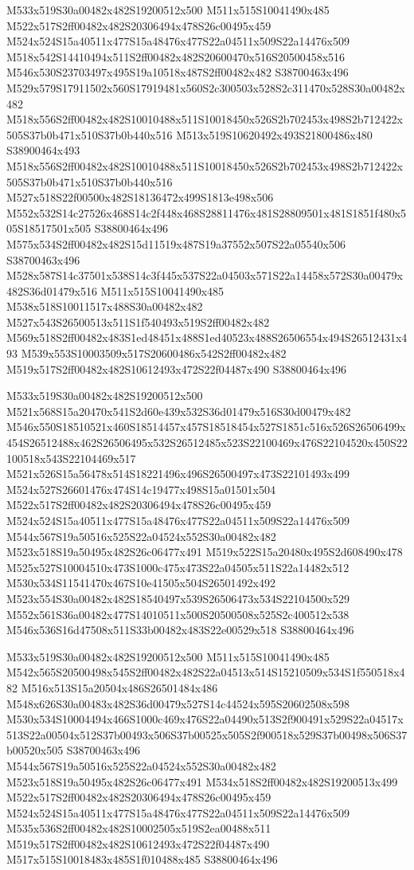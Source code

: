 \documentclass{article}
\begin{document}
\begin{multicols}{2}
M533x519S30a00482x482S19200512x500 M511x515S10041490x485 M522x517S2ff00482x482S20306494x478S26c00495x459 M524x524S15a40511x477S15a48476x477S22a04511x509S22a14476x509 M518x542S14410494x511S2ff00482x482S20600470x516S20500458x516 M546x530S23703497x495S19a10518x487S2ff00482x482 S38700463x496 M529x579S17911502x560S17919481x560S2c300503x528S2c311470x528S30a00482x482 M518x556S2ff00482x482S10010488x511S10018450x526S2b702453x498S2b712422x505S37b0b471x510S37b0b440x516 M513x519S10620492x493S21800486x480 S38900464x493 M518x556S2ff00482x482S10010488x511S10018450x526S2b702453x498S2b712422x505S37b0b471x510S37b0b440x516 M527x518S22f00500x482S18136472x499S1813e498x506 M552x532S14c27526x468S14c2f448x468S28811476x481S28809501x481S1851f480x505S18517501x505 S38800464x496 M575x534S2ff00482x482S15d11519x487S19a37552x507S22a05540x506 S38700463x496 M528x587S14c37501x538S14c3f445x537S22a04503x571S22a14458x572S30a00479x482S36d01479x516 M511x515S10041490x485 M538x518S10011517x488S30a00482x482 M527x543S26500513x511S1f540493x519S2ff00482x482 M569x518S2ff00482x483S1ed48451x488S1ed40523x488S26506554x494S26512431x493 M539x553S10003509x517S20600486x542S2ff00482x482 M519x517S2ff00482x482S10612493x472S22f04487x490 S38800464x496

M533x519S30a00482x482S19200512x500 M521x568S15a20470x541S2d60e439x532S36d01479x516S30d00479x482 M546x550S18510521x460S18514457x457S18518454x527S1851c516x526S26506499x454S26512488x462S26506495x532S26512485x523S22100469x476S22104520x450S22100518x543S22104469x517 M521x526S15a56478x514S18221496x496S26500497x473S22101493x499 M524x527S26601476x474S14c19477x498S15a01501x504 M522x517S2ff00482x482S20306494x478S26c00495x459 M524x524S15a40511x477S15a48476x477S22a04511x509S22a14476x509 M544x567S19a50516x525S22a04524x552S30a00482x482 M523x518S19a50495x482S26c06477x491 M519x522S15a20480x495S2d608490x478 M525x527S10004510x473S1000c475x473S22a04505x511S22a14482x512 M530x534S11541470x467S10e41505x504S26501492x492 M523x554S30a00482x482S18540497x539S26506473x534S22104500x529 M552x561S36a00482x477S14010511x500S20500508x525S2c400512x538 M546x536S16d47508x511S33b00482x483S22e00529x518 S38800464x496

M533x519S30a00482x482S19200512x500 M511x515S10041490x485 M542x565S20500498x545S2ff00482x482S22a04513x514S15210509x534S1f550518x482 M516x513S15a20504x486S26501484x486 M548x626S30a00483x482S36d00479x527S14c44524x595S20602508x598 M530x534S10004494x466S1000c469x476S22a04490x513S2f900491x529S22a04517x513S22a00504x512S37b00493x506S37b00525x505S2f900518x529S37b00498x506S37b00520x505 S38700463x496 M544x567S19a50516x525S22a04524x552S30a00482x482 M523x518S19a50495x482S26c06477x491 M534x518S2ff00482x482S19200513x499 M522x517S2ff00482x482S20306494x478S26c00495x459 M524x524S15a40511x477S15a48476x477S22a04511x509S22a14476x509 M535x536S2ff00482x482S10002505x519S2ea00488x511 M519x517S2ff00482x482S10612493x472S22f04487x490 M517x515S10018483x485S1f010488x485 S38800464x496


\end{multicols}
\end{document}
